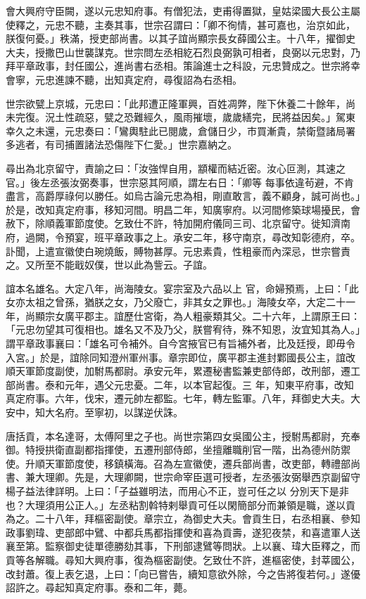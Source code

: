 \begin{pinyinscope}
 會大興府守臣闕，遂以元忠知府事。有僧犯法，吏甫得置獄，皇姑梁國大長公主屬使釋之，元忠不聽，主奏其事，世宗召謂曰：「卿不徇情，甚可嘉也，治京如此，朕復何憂。」秩滿，授吏部尚書。以其子誼尚顯宗長女薛國公主。十八年，擢御史大夫，授撒巴山世襲謀克。世宗問左丞相紇石烈良弼孰可相者，良弼以元忠對，乃
 拜平章政事，封任國公，進尚書右丞相。策論進士之科設，元忠贊成之。世宗將幸會寧，元忠進諫不聽，出知真定府，尋復詔為右丞相。



 世宗欲甓上京城，元忠曰：「此邦遭正隆軍興，百姓凋弊，陛下休養二十餘年，尚未完復。況土性疏惡，甓之恐難經久，風雨摧壞，歲歲繕完，民將益因矣。」駕東幸久之未還，元忠奏曰：「鸞輿駐此已閱歲，倉儲日少，市買漸貴，禁衛暨諸局署多逃者，有司捕置諸法恐傷陛下仁愛。」世宗嘉納之。



 尋出為北京留守，責諭之曰：「汝強悍自用，顓權而結近密。汝心叵測，其速之官。」後左丞張汝弼奏事，世宗惡其阿順，謂左右日：「卿等
 每事依違茍避，不肯盡言，高爵厚祿何以勝任。如烏古論元忠為相，剛直敢言，義不顧身，誠可尚也。」於是，改知真定府事，移知河間。明昌二年，知廣寧府。以河間修築球場擾民，會赦下，除順義軍節度使。乞致仕不許，特加開府儀同三司、北京留守。徙知濟南府，過闕，令預宴，班平章政事之上。承安二年，移守南京，尋改知彰德府，卒。訃聞，上遣宣徽使白琬燒飯，賻物甚厚。元忠素貴，性粗豪而內深忌，世宗嘗責之。又所至不能戢奴僕，世以此為訾云。子誼。



 誼本名雄名。大定八年，尚海陵女。宴宗室及六品以上
 官，命婦預焉，上曰：「此女亦太祖之曾孫，猶朕之女，乃父廢亡，非其女之罪也。」海陵女卒，大定二十一年，尚顯宗女廣平郡主。誼歷仕宮衛，為人粗豪類其父。二十六年，上謂原王曰：「元忠勿望其可復相也。雄名又不及乃父，朕嘗宥待，殊不知恩，汝宜知其為人。」謂平章政事襄曰：「雄名可令補外。自今宮掖官已有旨補外者，比及廷授，即毋令入宮。」於是，誼除同知澄州軍州事。章宗即位，廣平郡主進封鄴國長公主，誼改順天軍節度副使，加駙馬都尉。承安元年，累遷秘書監兼吏部侍郎，改刑部，遷工部尚書。泰和元年，遇父元忠憂。二年，以本官起復。三
 年，知東平府事，改知真定府事。六年，伐宋，遷元帥左都監。七年，轉左監軍。八年，拜御史大夫。大安中，知大名府。至寧初，以謀逆伏誅。



 唐括貢，本名達哥，太傅阿里之子也。尚世宗第四女吳國公主，授駙馬都尉，充奉御。特授拱衛直副都指揮使，五遷刑部侍郎，坐擅離職削官一階，出為德州防禦使。升順天軍節度使，移鎮橫海。召為左宣徽使，遷兵部尚書，改吏部，轉禮部尚書、兼大理卿。先是，大理卿闕，世宗命宰臣選可授者，左丞張汝弼舉西京副留守楊子益法律詳明。上曰：「子益雖明法，而用心不正，豈可任之以
 分別天下是非也？大理須用公正人。」左丞粘割斡特剌舉貢可任以閑簡部分而兼領是職，遂以貢為之。二十八年，拜樞密副使。章宗立，為御史大夫。會貢生日，右丞相襄、參知政事劉瑋、吏部郎中鷿、中都兵馬都指揮使和喜為貢壽，遂犯夜禁，和喜遣軍人送襄至第。監察御史徒單德勝劾其事，下刑部逮鷿等問狀。上以襄、瑋大臣釋之，而貢等各解職。尋知大興府事，復為樞密副使。乞致仕不許，進樞密使，封莘國公，改封蕭。復上表乞退，上曰：「向已嘗告，續知意欲外除，今之告將復若何。」遂優詔許之。尋起知真定府事。泰和二年，薨。




\end{pinyinscope}
